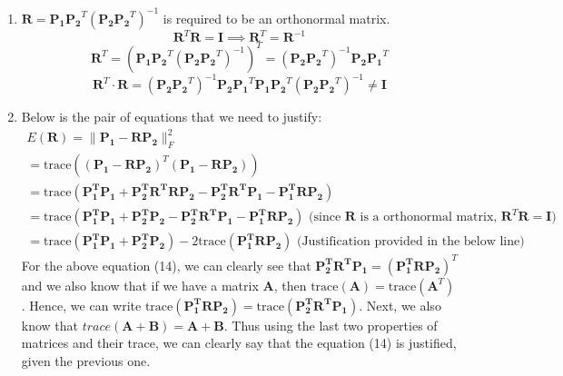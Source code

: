 \documentclass{article}
\begin{document}
\begin{enumerate}
\begin{enumerate}
    \item $\boldsymbol{R} = \boldsymbol{P_1} \boldsymbol{P_2}^T  (\boldsymbol{P_2} \boldsymbol{P_2}^T)^{-1}$ is required to be an orthonormal matrix.
           \[
              \boldsymbol{R}^T \boldsymbol{R} = \boldsymbol{I} \implies \boldsymbol{R}^T = \boldsymbol{R}^{-1}
           \]
            \[
                \boldsymbol{R}^T = \left( \boldsymbol{P_1} \boldsymbol{P_2}^T  (\boldsymbol{P_2} \boldsymbol{P_2}^T)^{-1} \right)^T = (\boldsymbol{P_2} \boldsymbol{P_2}^T)^{-1} \boldsymbol{P_2} \boldsymbol{P_1}^T
            \]
            \[
                \boldsymbol{R}^T \cdot \boldsymbol{R} = (\boldsymbol{P_2} \boldsymbol{P_2}^T)^{-1} \boldsymbol{P_2} \boldsymbol{P_1}^T \boldsymbol{P_1} \boldsymbol{P_2}^T  (\boldsymbol{P_2} \boldsymbol{P_2}^T)^{-1} \neq \boldsymbol{I}
            \]
    \item Below is the pair of equations that we need to justify:
        \begin{eqnarray}
        E(\boldsymbol{R}) = \|\boldsymbol{P_1} - \boldsymbol{R} \boldsymbol{P_2}\|^2_F \\
        = \textrm{trace}((\boldsymbol{P_1} -\boldsymbol{R} \boldsymbol{P_2})^T(\boldsymbol{P_1} - \boldsymbol{R} \boldsymbol{P_2})) \\
        = \textrm{trace}(\boldsymbol{P^T_1 P_1} + \boldsymbol{P^T_2 R^T R P_2} - \boldsymbol{P^T_2 R^T P_1} - \boldsymbol{P^T_1 R P_2}) \\
        = \textrm{trace}(\boldsymbol{P^T_1 P_1} + \boldsymbol{P^T_2 P_2} - \boldsymbol{P^T_2 R^T P_1} - \boldsymbol{P^T_1 R P_2})  \textrm{ (since $\boldsymbol{R}$ is a orthonormal matrix, $\boldsymbol{R}^T\boldsymbol{R} = \boldsymbol{I}$) } \\
        = \textrm{trace}(\boldsymbol{P^T_1 P_1} + \boldsymbol{P^T_2 P_2}) -2\textrm{trace}(\boldsymbol{P^T_1 R P_2}) \textrm{ (Justification provided in the below line) } 
        \end{eqnarray}
        For the above equation (14), we can clearly see that $\boldsymbol{P^T_2 R^T P_1} = \boldsymbol{(P^T_1 R P_2)}^T$ and we also know that if we have a matrix $\boldsymbol{A}$, then $\textrm{trace}(\boldsymbol{A}) = \textrm{trace}(\boldsymbol{A}^T)$. Hence, we can write $\textrm{trace}(\boldsymbol{P^T_1 R P_2}) = \textrm{trace}(\boldsymbol{P^T_2 R^T P_1})$.
        Next, we also know that $trace(\boldsymbol{A} + \boldsymbol{B}) = \boldsymbol{A} + \boldsymbol{B}$. Thus using the last two properties of matrices and their trace, we can clearly say that the equation (14) is justified, given the previous one.


\end{enumerate}
\end{enumerate}
\end{document}
